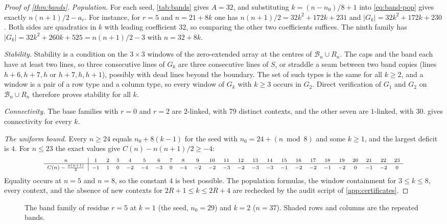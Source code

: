 \documentclass[10pt]{article}
\theoremstyle{remark}
\newcommand{\B}{\mathcal B}
\begin{document}
\begin{proof}[Proof of \cref{thm:bands}]
\emph{Population.}  For each seed, \cref{tab:bands} gives $A=32$, and
substituting $k=(n-n_0)/8+1$ into \eqref{eq:band-pop} gives exactly
$n(n+1)/2-a_r$.  For instance, for $r=5$ and $n=21+8k$ one has
$n(n+1)/2=32k^2+172k+231$ and $|G_k|=32k^2+172k+230$.  Both sides are
quadratics in $k$ with leading coefficient $32$, so comparing the other two
coefficients suffices.  The ninth family has $|G_k|=32k^2+260k+525=n(n+1)/2-3$
with $n=32+8k$.

\emph{Stability.}  Stability is a condition on the $3\times3$ windows of the
zero-extended array at the centres of $\B_n\cup R_n$.  The caps and the band
each have at least two lines, so three consecutive lines of $G_k$ are three
consecutive lines of $S$, or straddle a seam between two band copies (lines
$h+6,h+7,h$ or $h+7,h,h+1$), possibly with dead lines beyond the boundary.  The
set of such types is the same for all $k\ge2$, and a window is a pair of a row
type and a column type, so every window of $G_k$ with $k\ge3$ occurs in $G_2$.
Direct verification of $G_1$ and $G_2$ on $\B_n\cup R_n$ therefore proves
stability for all $k$.

\emph{Connectivity.}  The base families with $r=0$ and $r=2$ are $2$-linked,
with 79 distinct contexts, and the other seven are $1$-linked, with 30.
 gives connectivity for every $k$.

\emph{The uniform bound.}  Every $n\ge24$ equals $n_0+8(k-1)$ for the seed with
$n_0=24+(n\bmod8)$ and some $k\ge1$, and the largest deficit is $4$.  For
$n\le23$ the exact values give $C(n)-n(n+1)/2\ge-4$:
\[
\scriptsize
\begin{array}{c|ccccccccccccccccccccccc}
n&1&2&3&4&5&6&7&8&9&10&11&12&13&14&15&16&17&18&19&20&21&22&23\\
\hline
C(n)-\frac{n(n+1)}2&-1&1&0&-2&-4&-3&0&-4&-2&-2&-3&-2&-3&-3&-1&-2&-2&-1&-2&0&-1&-2&0
\end{array}
\]
Equality occurs at $n=5$ and $n=8$, so the constant $4$ is best possible.  The
population formulas, the window containment for $3\le k\le8$, every context, and
the absence of new contexts for $2R+1\le k\le2R+4$ are rechecked by the audit
script of \cref{app:certificates}.
\end{proof}

\begin{figure}[t]
\centering

\caption{The band family of residue $r=5$ at $k=1$ (the seed, $n_0=29$) and
$k=2$ ($n=37$).  Shaded rows and columns are the repeated bands.}
\label{fig:band-family}
\end{figure}
\end{document}
